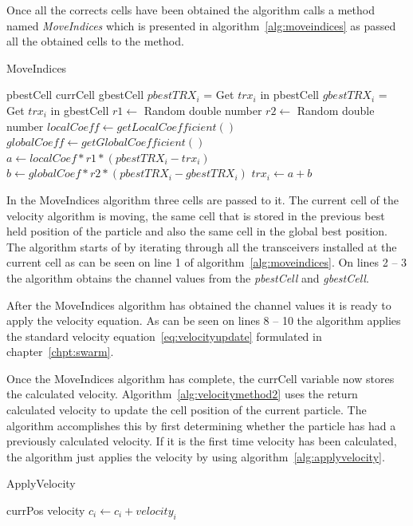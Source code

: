 Once all the corrects cells have been obtained the algorithm calls a method named \emph{MoveIndices} which is presented in algorithm~\ref{alg:moveindices} as passed all the obtained cells to the method.
\begin{algorithm}
\caption {MoveIndices}
\label{alg:moveindices}
\begin{algorithmic}[1]
	\REQUIRE pbestCell
	\REQUIRE currCell
	\REQUIRE gbestCell
		\STATE $pbestTRX_i$ = Get $trx_i$ in pbestCell
		\STATE $gbestTRX_i$ = Get $trx_i$ in gbestCell
		\STATE $r1 \leftarrow$ Random double number
		\STATE $r2 \leftarrow$ Random double number
		\STATE $localCoeff \leftarrow getLocalCoefficient()$
		\STATE $globalCoeff \leftarrow getGlobalCoefficient()$
		\STATE $a \leftarrow localCoef * r1 * (pbestTRX_i - trx_i)$
		\STATE $b \leftarrow globalCoef * r2 * (pbestTRX_i - gbestTRX_i)$
		\STATE $trx_i \leftarrow a + b$
	\ENDFOR
\end{algorithmic}
\end{algorithm}

In the MoveIndices algorithm three cells are passed to it. The current cell of the velocity algorithm is moving, the same cell that is stored in the previous best held position of the particle and also the same cell in the global best position. The algorithm starts of by iterating through all the transceivers installed at the current cell as can be seen on line 1 of algorithm~\ref{alg:moveindices}. On lines 2 -- 3 the algorithm obtains the channel values from the \emph{pbestCell} and \emph{gbestCell}.

After the MoveIndices algorithm has obtained the channel values it is ready to apply the velocity equation. As can be seen on lines 8 -- 10 the algorithm applies the standard velocity equation~\ref{eq:velocityupdate} formulated in chapter~\ref{chpt:swarm}. 

Once the MoveIndices algorithm has complete, the currCell variable now stores the calculated velocity. Algorithm~\ref{alg:velocitymethod2} uses the return calculated velocity to update the cell position of the current particle. The algorithm accomplishes this by first determining whether the particle has had a previously calculated velocity. If it is the first time velocity has been calculated, the algorithm just applies the velocity by using algorithm~\ref{alg:applyvelocity}. 

\begin{algorithm}
\caption{ApplyVelocity}
\label{alg:applyvelocity}
\begin{algorithmic}[1]
	\REQUIRE currPos
	\REQUIRE velocity
		\STATE $c_i \leftarrow c_i + velocity_i$
	\ENDFOR
\end{algorithmic}
\end{algorithm}

